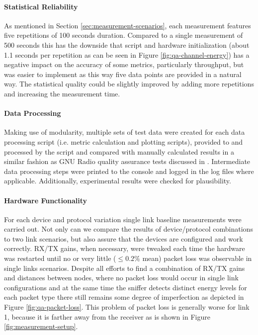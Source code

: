 \paragraph{Statistical Reliability}
As mentioned in Section \ref{sec:measurement-scenarios}, each measurement features five repetitions of 100 seconds duration. Compared to a single measurement of 500 seconds this has the downside that script and hardware initialization (about 1.1 seconds per repetition as can be seen in Figure \ref{fig:qa-channel-energy}) has a negative impact on the accuracy of some metrics, particularly throughput, but was easier to implement as this way five data points are provided in a natural way. The statistical quality could be slightly improved by adding more repetitions and increasing the measurement time. 

\paragraph{Data Processing}
Making use of modularity, multiple sets of test data were created for each data processing script (i.e. metric calculation and plotting scripts), provided to and processed by the script and compared with manually calculated results in a similar fashion as GNU Radio quality assurance tests discussed in \cite{gr-python-tut}. Intermediate data processing steps were printed to the console and logged in the log files where applicable. Additionally, experimental results were checked for plausibility. 

\paragraph{Hardware Functionality}
For each device and protocol variation single link baseline measurements were carried out. Not only can we compare the results of device/protocol combinations to two link scenarios, but also assure that the devices are configured and work correctly. RX/TX gains, when necessary, were tweaked each time the hardware was restarted until no or very little ($\le0.2\%$ mean) packet loss was observable in single links scenarios.
Despite all efforts to find a combination of RX/TX gains and distances between nodes, where no packet loss would occur in single link configurations and at the same time the sniffer detects distinct energy levels for each packet type there still remains some degree of imperfection as depicted in Figure \ref{fig:qa-packet-loss}. This problem of packet loss is generally worse for link 1, because it is farther away from the receiver as is shown in Figure \ref{fig:measurement-setup}.  

